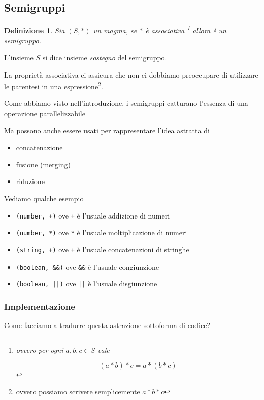 \documentclass[12pt]{article}
\newtheorem{definition}{Definizione}
\begin{document}
\subsection{Semigruppi}

\begin{definition}
Sia $(S, *)$ un magma, se $*$ è associativa \footnote{ovvero per ogni $a, b, c \in S$ vale

$$
(a * b) * c = a * ( b * c )
$$
} allora è un \emph{semigruppo}.
\end{definition}

L'insieme $S$ si dice insieme \emph{sostegno} del semigruppo.

La proprietà associativa ci assicura che non ci dobbiamo preoccupare di utilizzare le parentesi in una espressione\footnote{ovvero possiamo scrivere semplicemente $a * b * c$}.

Come abbiamo visto nell'introduzione, i semigruppi catturano l'essenza di una operazione parallelizzabile

Ma possono anche essere usati per rappresentare l'idea astratta di

\begin{itemize}
  \item concatenazione
  \item fusione (merging)
  \item riduzione
\end{itemize}

Vediamo qualche esempio

\begin{itemize}
  \item \texttt{(number, +)} ove \texttt{+} è l'usuale addizione di numeri
  \item \texttt{(number, *)} ove \texttt{*} è l'usuale moltiplicazione di numeri
  \item \texttt{(string, +)} ove \texttt{+} è l'usuale concatenazioni di stringhe
  \item \texttt{(boolean, \&\&)} ove \texttt{\&\&} è l'usuale congiunzione
  \item \texttt{(boolean, ||)} ove \texttt{||} è l'usuale disgiunzione
\end{itemize}

\subsubsection{Implementazione}

Come facciamo a tradurre questa astrazione sottoforma di codice?
\end{document}
